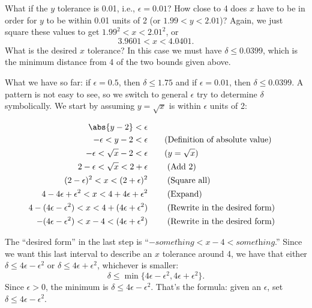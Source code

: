{What if the $y$ tolerance is 0.01, i.e.,  $\epsilon =0.01$?  How close to 4 does $x$ have to be in order for $y$ to be within 0.01 units of 2 (or $1.99 < y < 2.01$)?  Again, we just square these values to get
$1.99^2 < x < 2.01^2$, or 
\[3.9601 < x < 4.0401\text{.}\]
What is the desired $x$ tolerance?  In this case we must have $\delta \leq 0.0399$, which is the minimum distance from 4 of the two bounds given above.  %

\drawexampleline

What we have so far: if $\epsilon =0.5$, then $\delta \leq 1.75$ and if $\epsilon = 0.01$, then $\delta \leq 0.0399$. A pattern is not easy to see, so we switch to general $\epsilon$ try to determine $\delta$ symbolically.  We start by assuming $y=\sqrt{x}$ is within $\epsilon$ units of 2:

\begin{align*}
\abs{y - 2} < \epsilon \\
-\epsilon < y - 2 < \epsilon & \qquad \textrm{(Definition of absolute value)}\\
-\epsilon < \sqrt{x} - 2 < \epsilon  &\qquad\text{($y=\sqrt{x}$)}\\
2 - \epsilon < \sqrt{x} < 2+ \epsilon &\qquad \textrm{ (Add 2)}\\
(2 - \epsilon)^2 < x < (2+ \epsilon) ^2 &\qquad \textrm{ (Square all)}\\
4 - 4\epsilon + \epsilon^2 < x < 4 + 4\epsilon + \epsilon^2 &\qquad \textrm{ (Expand)}\\
4 - (4\epsilon - \epsilon^2) < x < 4 + (4\epsilon + \epsilon^2) &\qquad \textrm{ (Rewrite in the desired form)} \\
- (4\epsilon - \epsilon^2) < x-4 < (4\epsilon + \epsilon^2) &\qquad \textrm{ (Rewrite in the desired form)}
\end{align*}

The ``desired form'' in the last step is ``$-\textit{something} < x-4 < \textit{something}$.''
Since we want this last interval to describe an $x$ tolerance around 4, we have that either $\delta \leq 4\epsilon - \epsilon^2$ or $\delta \leq 4\epsilon + \epsilon^2$, whichever is smaller: \[\delta \leq \min\{4\epsilon - \epsilon^2, 4\epsilon + \epsilon^2\}\text{.}\]  Since $\epsilon > 0$, the minimum is $\delta \leq 4\epsilon - \epsilon^2$.  That's the formula: given an $\epsilon$, set $\delta \leq 4\epsilon-\epsilon^2$. 

}

